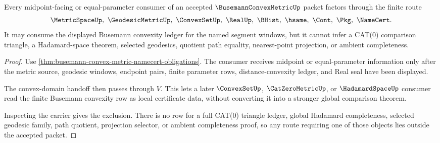 \begin{theorem}
\label{thm:busemann-convex-metric-midpoint-nonescape}
Every midpoint-facing or equal-parameter consumer of an accepted $\BusemannConvexMetricUp$ packet factors through the finite route
$$
\MetricSpaceUp,\ \GeodesicMetricUp,\ \ConvexSetUp,\ \RealUp,\ \BHist,\ \hsame,\ \Cont,\ \Pkg,\ \NameCert .
$$
It may consume the displayed Busemann convexity ledger for the named segment windows, but it cannot infer a CAT(0) comparison triangle, a Hadamard-space theorem, selected geodesics, quotient path equality, nearest-point projection, or ambient completeness.
\end{theorem}
\begin{proof}
Use \autoref{thm:busemann-convex-metric-namecert-obligations}. The consumer receives midpoint or equal-parameter information only after the metric source, geodesic windows, endpoint pairs, finite parameter rows, distance-convexity ledger, and Real seal have been displayed.

The convex-domain handoff then passes through $V$. This lets a later $\ConvexSetUp$, $\CatZeroMetricUp$, or $\HadamardSpaceUp$ consumer read the finite Busemann convexity row as local certificate data, without converting it into a stronger global comparison theorem.

Inspecting the carrier gives the exclusion. There is no row for a full CAT(0) triangle ledger, global Hadamard completeness, selected geodesic family, path quotient, projection selector, or ambient completeness proof, so any route requiring one of those objects lies outside the accepted packet.
\end{proof}


\begin{closurestatus}{\BusemannConvexMetricUp}
  \theoryclosure{\seedClosure}
  \formalstatus{\unformalizedV}
\end{closurestatus}
